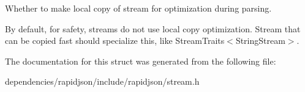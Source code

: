 Whether to make local copy of stream for optimization during parsing. 

By default, for safety, streams do not use local copy optimization. Stream that can be copied fast should specialize this, like Stream\+Traits$<$\+String\+Stream$>$. 

The documentation for this struct was generated from the following file\+:\begin{DoxyCompactItemize}
\item 
dependencies/rapidjson/include/rapidjson/stream.\+h\end{DoxyCompactItemize}
